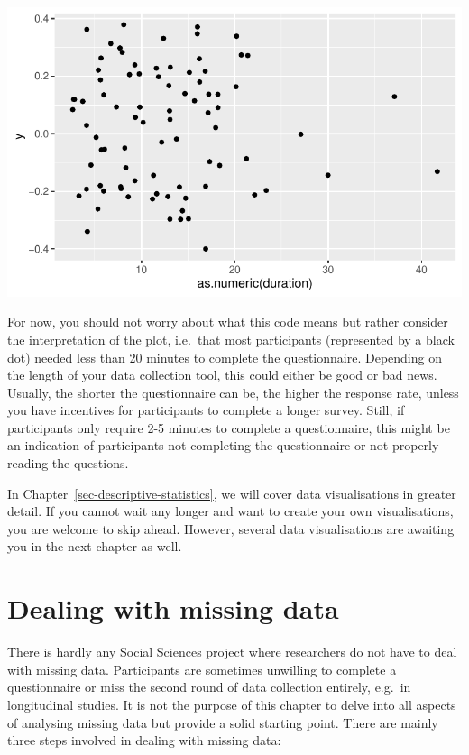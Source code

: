 \documentclass[
  letterpaper,
  DIV=11,
  numbers=noendperiod]{scrreprt}
\begin{document}
\includegraphics{07_data_wrangling_files/figure-pdf/duration-boxplot-1.pdf}

For now, you should not worry about what this code means but rather
consider the interpretation of the plot, i.e.~that most participants
(represented by a black dot) needed less than 20 minutes to complete the
questionnaire. Depending on the length of your data collection tool,
this could either be good or bad news. Usually, the shorter the
questionnaire can be, the higher the response rate, unless you have
incentives for participants to complete a longer survey. Still, if
participants only require 2-5 minutes to complete a questionnaire, this
might be an indication of participants not completing the questionnaire
or not properly reading the questions.

In Chapter~\ref{sec-descriptive-statistics}, we will cover data
visualisations in greater detail. If you cannot wait any longer and want
to create your own visualisations, you are welcome to skip ahead.
However, several data visualisations are awaiting you in the next
chapter as well.

\section{Dealing with missing data}\label{sec-dealing-with-missing-data}

There is hardly any Social Sciences project where researchers do not
have to deal with missing data. Participants are sometimes unwilling to
complete a questionnaire or miss the second round of data collection
entirely, e.g.~in longitudinal studies. It is not the purpose of this
chapter to delve into all aspects of analysing missing data but provide
a solid starting point. There are mainly three steps involved in dealing
with missing data:
\end{document}
